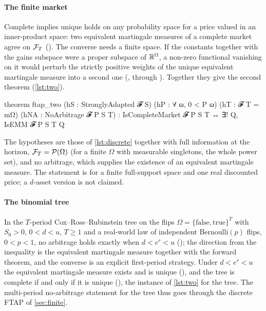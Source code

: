 \documentclass[11pt]{article}
\begin{document}
\paragraph{The finite market}
Complete implies unique holds on any probability space for a price valued in an inner-product space:
two equivalent martingale measures of a complete market agree on $\mathcal{F}_T$
(). The converse needs a finite space. If the constants together with the
gains subspace were a proper subspace of $\mathbb{R}^\Omega$, a non-zero functional vanishing on it would perturb the strictly positive weights of the
unique equivalent martingale measure into a second one (, through
). Together they give the second theorem (\cref{lst:two}).

\begin{leancode}[caption={The second theorem on a finite space (\texttt{Foundations/FTAPComplete}); the context is that of \cref{lst:discrete}.},label=lst:two]
theorem ftap_two (hS : StronglyAdapted 𝓕 S) (hP : ∀ ω, 0 < P {ω})
    (hT : 𝓕 T = mΩ) (hNA : NoArbitrage 𝓕 P S T) :
    IsCompleteMarket 𝓕 P S T ↔ ∃! Q, IsEMM 𝓕 P S T Q
\end{leancode}

The hypotheses are those of \cref{lst:discrete} together with full information at the horizon, $\mathcal{F}_T=\mathcal{P}(\Omega)$
(for a finite $\Omega$ with measurable singletons, the whole power set), and no arbitrage, which supplies the existence of an
equivalent martingale measure. The statement is for a finite full-support space and one real discounted price; a $d$-asset version is not claimed.

\paragraph{The binomial tree}
In the $T$-period Cox--Ross--Rubinstein tree on the flips $\Omega=\{\mathrm{false},\mathrm{true}\}^T$ with $S_0>0$, $0<d<u$, $T\ge1$ and a real-world law of
independent Bernoulli$(p)$ flips, $0<p<1$, no arbitrage holds exactly when $d<e^r<u$
(); the direction from the inequality is the equivalent martingale measure
together with the forward theorem, and the converse is an explicit first-period strategy. Under $d<e^r<u$ the equivalent martingale measure exists
and is unique (), and the tree is complete if and only if it is unique
(), the instance of \cref{lst:two} for the tree. The multi-period no-arbitrage statement for the tree
thus goes through the discrete FTAP of \cref{sec:finite}.
\end{document}
